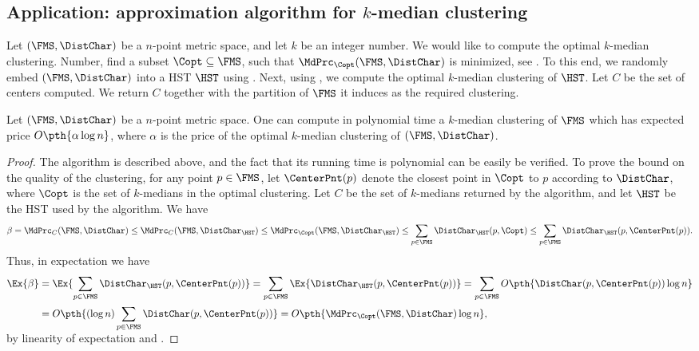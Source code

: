 \subsection{Application: approximation algorithm for $k$-median clustering}

Let $(\FMS,\DistChar)$ be a $n$-point metric space, and let $k$ be an
integer number. We would like to compute the optimal $k$-median
clustering. Number, find a subset $\Copt \subseteq \FMS$, such that
$\MdPrc_{\Copt}(\FMS,\DistChar)$ is minimized, see . To
this end, we randomly embed $(\FMS,\DistChar)$ into a HST $\HST$ using
. Next, using , we compute the optimal
$k$-median clustering of $\HST$. Let $C$ be the set of centers
computed. We return $C$ together with the partition of $\FMS$ it
induces as the required clustering.

\begin{theorem}
    Let $(\FMS,\DistChar)$ be a $n$-point metric space. One can compute in
    polynomial time a $k$-median clustering of $\FMS$ which has
    expected price $O\pth{ \alpha \log n }$, where $\alpha$ is the
    price of the optimal $k$-median clustering of $(\FMS,\DistChar)$.
\end{theorem}

\begin{proof}
    The algorithm is described above, and the fact that its running
    time is polynomial can be easily be verified. To prove the bound
    on the quality of the clustering, for any point $p \in \FMS$, let
    $\CenterPnt(p)$ denote the closest point in $\Copt$ to $p$
    according to $\DistChar$, where $\Copt$ is the set of $k$-medians
    in the optimal clustering.  Let $C$ be the set of $k$-medians
    returned by the algorithm, and let $\HST$ be the HST used by the
    algorithm. We have
    \begin{equation*}
        \beta%
        =%
        \MdPrc_C(\FMS,\DistChar) \leq \MdPrc_C(\FMS,\DistChar_\HST) \leq
        \MdPrc_{\Copt}(\FMS,\DistChar_\HST) \leq \sum_{p \in \FMS}
        \DistChar_\HST(p, \Copt) \leq \sum_{p \in \FMS} \DistChar_\HST(p,
        \CenterPnt(p)).
    \end{equation*}
    Thus, in expectation we have
    \begin{align*}
      \Ex{\beta}%
      &= %
        \Ex{ \Bigl. \smash{\sum_{p \in \FMS} \DistChar_\HST(p,
        \CenterPnt(p))}}%
        =%
        \sum_{p \in \FMS} \Ex{ \DistChar_\HST(p, \CenterPnt(p))} =  \sum_{p \in
        \FMS} O \pth{ \DistChar(p, \CenterPnt(p)) \log n }
      \\&%
      =%
      O\pth{ \Bigl. \smash{ (\log n)
      \sum_{p \in \FMS} \DistChar(p, \CenterPnt(p)) }}%
      =%
      O \pth{ \MdPrc_{\Copt}(\FMS,\DistChar) \log n},
    \end{align*}
    by linearity of expectation and .
\end{proof}




